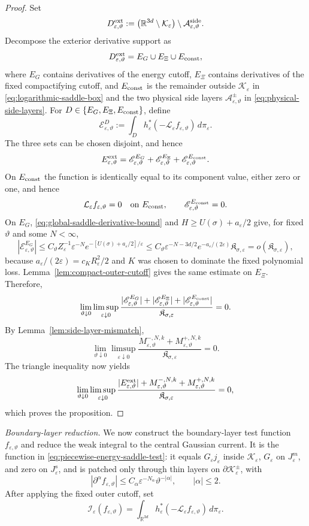 \documentclass[11pt]{article}
\numberwithin{equation}{section}
\theoremstyle{plain}
\theoremstyle{definition}
\theoremstyle{remark}
\newcommand{\R}{\mathbb R}
\newcommand{\eps}{\varepsilon}
\newcommand{\calL}{\mathcal L}
\begin{document}
\begin{proof}
Set
\[
D_{\eps,\vartheta}^{\rm ext}
:=\left(\R^{3d}\setminus\mathcal K_\eps\right)
\setminus\mathcal A_{\eps,\vartheta}^{\rm side}.
\]
Decompose the exterior derivative support as
\[
D_{\eps,\vartheta}^{\rm ext}=E_G\cup E_\Xi\cup E_{\rm const},
\]
where $E_G$ contains derivatives of the energy cutoff, $E_\Xi$ contains
derivatives of the fixed compactifying cutoff, and $E_{\rm const}$ is the
remainder outside $\mathcal K_\eps$ in
\eqref{eq:logarithmic-saddle-box} and the two physical side layers
$\mathcal A_{\eps,\vartheta}^\pm$ in \eqref{eq:physical-side-layers}.
For $D\in\{E_G,E_\Xi,E_{\rm const}\}$, define
\[
\mathscr E_{\eps,\vartheta}^{D}
:=\int_Dh_\eps^*(-\calL_\eps f_{\eps,\vartheta})\,d\pi_\eps.
\]
The three sets can be chosen disjoint, and hence
\[
E_{\eps,\vartheta}^{\rm ext}
=\mathscr E_{\eps,\vartheta}^{E_G}
+\mathscr E_{\eps,\vartheta}^{E_\Xi}
+\mathscr E_{\eps,\vartheta}^{E_{\rm const}}.
\]
On $E_{\rm const}$ the function is identically equal to its component value,
either zero or one, and hence
\[
\calL_\eps f_{\eps,\vartheta}=0\quad\hbox{on }E_{\rm const},
\qquad
\mathscr E_{\eps,\vartheta}^{E_{\rm const}}=0.
\]
On $E_G$, \eqref{eq:global-saddle-derivative-bound} and
$H\ge U(\sigma)+a_\eps/2$ give, for fixed $\vartheta$ and some $N<\infty$,
\[
\left|\mathscr E_{\eps,\vartheta}^{E_G}\right|
\le C_\vartheta Z_\eps^{-1}\eps^{-N}
e^{-[U(\sigma)+a_\eps/2]/\eps}
\le C_\vartheta\eps^{-N-3d/2}
e^{-a_\eps/(2\eps)}\mathfrak K_{\sigma,\eps}
=o(\mathfrak K_{\sigma,\eps}),
\]
because $a_\eps/(2\eps)=c_KR_\eps^2/2$ and $K$ was chosen to dominate
the fixed polynomial loss.  Lemma~\ref{lem:compact-outer-cutoff} gives the
same estimate on $E_\Xi$.  Therefore,
\[
\lim_{\vartheta\downarrow0}\limsup_{\eps\downarrow0}
\frac{
|\mathscr E_{\eps,\vartheta}^{E_G}|
+|\mathscr E_{\eps,\vartheta}^{E_\Xi}|
+|\mathscr E_{\eps,\vartheta}^{E_{\rm const}}|}
{\mathfrak K_{\sigma,\eps}}=0.
\]
By Lemma~\ref{lem:side-layer-mismatch},
\[
\lim_{\vartheta\downarrow0}\limsup_{\eps\downarrow0}
\frac{M_{\eps,\vartheta}^{-,N,k}+M_{\eps,\vartheta}^{+,N,k}}
{\mathfrak K_{\sigma,\eps}}=0.
\]
The triangle inequality now yields
\[
\lim_{\vartheta\downarrow0}\limsup_{\eps\downarrow0}
\frac{
|E_{\eps,\vartheta}^{\rm ext}|
+M_{\eps,\vartheta}^{-,N,k}
+M_{\eps,\vartheta}^{+,N,k}}
{\mathfrak K_{\sigma,\eps}}=0,
\]
which proves the proposition.
\end{proof}

\emph{Boundary-layer reduction.}  We now construct the boundary-layer test
function $f_{\eps,\vartheta}$ and reduce the weak integral to the central Gaussian
current.  It is the function in
\eqref{eq:piecewise-energy-saddle-test}: it equals $G_\eps j_\eps$ inside
$\mathcal K_\eps$, $G_\eps$ on $J_\eps^m$, and zero on $J_\eps^s$, and is
patched only through thin layers on $\partial\mathcal K_\eps^\pm$, with
\[
|\partial^\alpha f_{\eps,\vartheta}|\le C_\alpha\eps^{-N_\alpha}\vartheta^{-|\alpha|},
\qquad
|\alpha|\le2.
\]
After applying the fixed outer cutoff, set
\[
\mathcal I_\eps(f_{\eps,\vartheta})=
\int_{\R^{3d}}h_\eps^*(-\calL_\eps f_{\eps,\vartheta})\,d\pi_\eps.
\]
\end{document}
